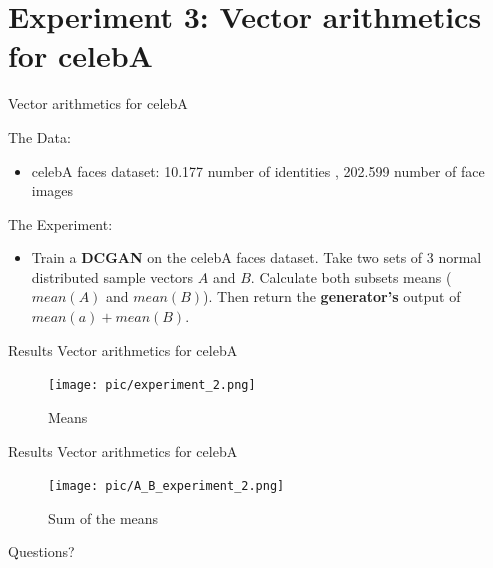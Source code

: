 \documentclass[10pt]{beamer}
\begin{document}
\section{Experiment 3: Vector arithmetics for celebA}

{
\begin{frame}{Vector arithmetics for celebA}
      \begin{block}{The Data:}
	\begin{itemize}
    \item celebA faces dataset: 10.177 number of identities
    , 202.599 number of face images
  \end{itemize}
    \end{block}
        \begin{block}{The Experiment:}
	\begin{itemize}
	\item Train a \textbf{DCGAN} on the celebA faces dataset. Take two sets of 3 normal distributed sample vectors $A$ and $B$. Calculate both subsets means ($mean(A)$ and $mean(B)$). Then return the \textbf{generator's} output of $mean(a) + mean(B)$.
  \end{itemize}
    \end{block}
\end{frame}
}

{
\begin{frame}{Results Vector arithmetics for celebA}
\begin{figure}[htbp] 
  \centering
     \texttt{[image: pic/experiment\_2.png]}
  \caption{Means }
  \label{fig:Bild1}
\end{figure}
\end{frame}
}

{
\begin{frame}{Results Vector arithmetics for celebA}
\begin{figure}[htbp] 
  \centering
     \texttt{[image: pic/A\_B\_experiment\_2.png]}
  \caption{Sum of the means }
  \label{fig:Bild1}
\end{figure}
\end{frame}
}


\begin{frame}[standout]
  Questions?
\end{frame}
\end{document}
